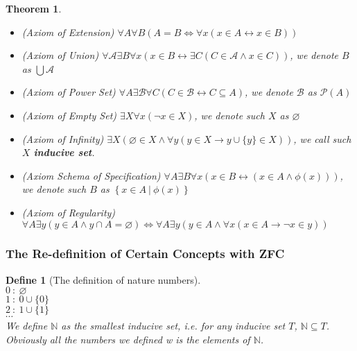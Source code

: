 \documentclass{ctexart}
\newcommand{\。}{．} %
\newcommand{\NN}{\mathbb{N}} %
\newenvironment{lvse}{
    \begin{tcolorbox}[enhanced, breakable, colback=qlv, boxrule=0pt, frame hidden,
        borderline west={0.7mm}{0.1mm}{slv}]
    }
    {\end{tcolorbox}}
\newenvironment{huangse}{
    \begin{tcolorbox}[enhanced, breakable, colback=qhuang, boxrule=0pt, frame hidden,
        borderline west={0.7mm}{0.1mm}{shuang}]
    }
    {\end{tcolorbox}}
\theoremstyle{t} %
\newtheorem{dyhj}{\color{slv} Define}[subsection] %
\newtheorem{dlhj}{\color{shuang} Theorem}[subsection]
\newenvironment{dy}{\begin{lvse}\begin{dyhj}}{\end{dyhj}\end{lvse}}
\newenvironment{dl}{\begin{huangse}\begin{dlhj}}{\end{dlhj}\end{huangse}}
\begin{document}
\begin{dl}\quad
    \begin{itemize}
        \item (Axiom of Extension) $\forall A \forall B (A = B \Leftrightarrow \forall x (x \in A \leftrightarrow x \in B))$
        \item (Axiom of Union) $\forall \mathcal{A} \exists B \forall x (x \in B \leftrightarrow \exists C (C \in \mathcal{A} \land x \in C))$, we denote $B$ as $\bigcup \mathcal{A}$
        \item (Axiom of Power Set) $\forall A \exists \mathcal{B} \forall C(C \in \mathcal{B} \leftrightarrow C \subseteq A)$, we denote $\mathcal{B}$ as $\mathcal{P}(A)$
        \item (Axiom of Empty Set) $\exists X \forall x(\lnot x \in X)$, we denote such $X$ as $\varnothing$
        \item (Axiom of Infinity) $\exists X(\varnothing \in X \land \forall y(y \in X \rightarrow y \cup \{y\} \in X))$, we call such $X$ \textbf{inducive set}.
        \item (Axiom Schema of Specification) $\forall A \exists B \forall x (x \in B \leftrightarrow (x \in A \land \phi(x)))$, we denote such $B$ as $\left\{x \in A\ |\ \phi(x)\right\}$
        \item (Axiom of Regularity) $\forall A \exists y(y \in A \land y \cap A = \varnothing) \Leftrightarrow \forall A \exists y(y \in A \land \forall x (x \in A \rightarrow \lnot x \in y))$
    \end{itemize}
\end{dl}

\subsubsection{The Re-definition of Certain Concepts with ZFC}

\begin{dy}[The definition of nature numbers]\quad \\
    $0\ :\ \varnothing$ \\
    $1\ :\ 0 \cup \{0\}$ \\
    $2\ :\ 1 \cup \{1\}$ \\
    $\cdots$ \\
    We define $\NN$ as the smallest inducive set, i.e. for any inducive set $T$, $\NN \subseteq T$. \\
    Obviously all the numbers we defined w is the elements of $\NN$.
\end{dy}
\end{document}
